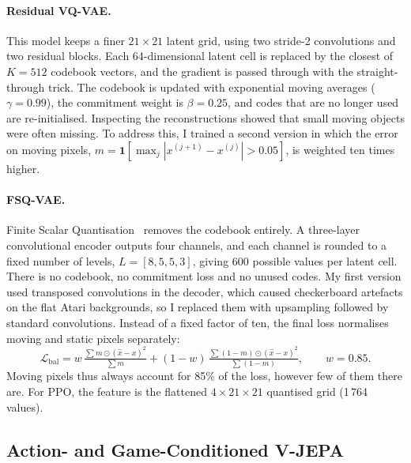 \documentclass[runningheads]{llncs}
\begin{document}
\paragraph{Residual VQ-VAE.} This model keeps a finer $21\times21$ latent grid, using two
stride-2 convolutions and two residual blocks. Each 64-dimensional latent cell is replaced by
the closest of $K=512$ codebook vectors, and the gradient is passed through with the
straight-through trick. The codebook is updated with exponential moving averages
($\gamma=0.99$), the commitment weight is $\beta=0.25$, and codes that are no longer used are
re-initialised. Inspecting the reconstructions showed that small moving objects were often
missing. To address this, I trained a second version in which the error on moving pixels,
$m=\mathbf{1}[\max_j|x^{(j+1)}-x^{(j)}|>0.05]$, is weighted ten times higher.

\paragraph{FSQ-VAE.} Finite Scalar Quantisation~\cite{mentzer2024fsq} removes the codebook
entirely. A three-layer convolutional encoder outputs four channels, and each channel is
rounded to a fixed number of levels, $L=[8,5,5,3]$, giving 600 possible values per latent cell.
There is no codebook, no commitment loss and no unused codes. My first version
used transposed convolutions in the decoder, which caused checkerboard artefacts on the flat
Atari backgrounds, so I replaced them with upsampling followed by standard convolutions.
Instead of a fixed factor of ten, the final loss normalises moving and static pixels
separately:
\begin{equation}
  \mathcal{L}_{\text{bal}} = w\,\tfrac{\sum m\odot(\hat x-x)^2}{\sum m}
  +(1-w)\,\tfrac{\sum (1-m)\odot(\hat x-x)^2}{\sum (1-m)},\qquad w=0.85.
\end{equation}
Moving pixels thus always account for 85\% of the loss, however few of them there are.
For PPO, the feature is the flattened $4\times21\times21$ quantised grid (1\,764 values).

\subsection{Action- and Game-Conditioned V-JEPA}
\end{document}
